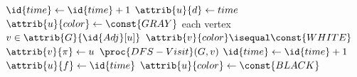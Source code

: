 \documentclass[aspectratio=1610]{beamer}
\begin{document}
\begin{frame}
\begin{columns}
\begin{block}{}
            \vspace{-2\abovedisplayskip}
            \begin{codebox}
                \li $\id{time} \gets \id{time} + 1$ 
                \li $\attrib{u}{d} \gets time$ 
                \li $\attrib{u}{color} \gets \const{GRAY}$ 
                \li \For each vertex $v \in \attrib{G}{\id{Adj}[u]}$ \Do
                \li     \If $\attrib{v}{color} \isequal \const{WHITE}$ \Then
                \li         $\attrib{v}{\pi} \gets u$ 
                \li         $\proc{DFS-Visit}(G,v)$
                        \End
                    \End
                \li $\id{time} \gets \id{time} + 1$ 
                \li $\attrib{u}{f} \gets \id{time}$ 
                \li $\attrib{u}{color} \gets \const{BLACK}$ 
            \end{codebox}
        \end{block}

    \end{columns}
\end{frame}
\end{document}
